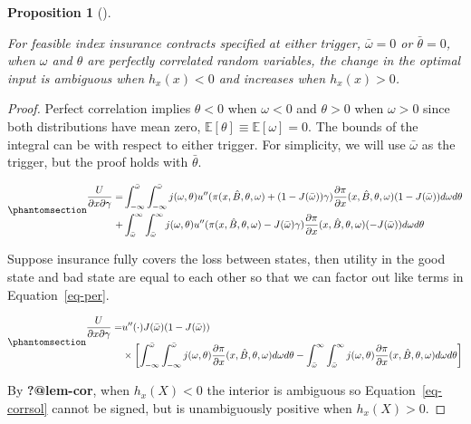 \documentclass[
  letterpaper,
  DIV=11,
  numbers=noendperiod]{scrartcl}
\theoremstyle{plain}
\theoremstyle{plain}
\newtheorem{proposition}{Proposition}[section]
\theoremstyle{remark}
\begin{document}
\begin{proposition}[]\protect\hypertarget{prp-corr}{}\label{prp-corr}

For feasible index insurance contracts specified at either trigger,
\(\bar\omega=0\) or \(\bar\theta=0\), when \(\omega\) and \(\theta\) are
perfectly correlated random variables, the change in the optimal input
is ambiguous when \(h_x(x)<0\) and increases when \(h_x(x)>0\).

\end{proposition}

\begin{proof}
Perfect correlation implies \(\theta<0\) when \(\omega<0\) and
\(\theta>0\) when \(\omega>0\) since both distributions have mean zero,
\(\mathbb{E}[\theta]\equiv\mathbb{E}[\omega]=0\). The bounds of the
integral can be with respect to either trigger. For simplicity, we will
use \(\bar\omega\) as the trigger, but the proof holds with
\(\bar\theta\).

\begin{equation}\phantomsection\label{eq-per}{
\begin{aligned}
\frac{U}{\partial x \partial \gamma}=&\int^{\bar\omega}_{-\infty} \int^{\bar\omega}_{-\infty}j(\omega,\theta)u''(\pi(x,\hat{B},\theta,\omega)+(1-J(\bar\omega))\gamma)\frac{\partial \pi}{\partial x}(x,\hat{B},\theta,\omega)(1-J(\bar\omega))d\omega d\theta\\
+&\int^{\infty}_{\bar\omega}\int^{\infty}_{\bar{\omega}}j(\omega,\theta) u''(\pi(x,\hat{B},\theta,\omega)-J(\bar\omega)\gamma)\frac{\partial \pi}{\partial x}(x,\hat{B},\theta,\omega)(-J(\bar\omega))d\omega d\theta
\end{aligned}
}\end{equation}

Suppose insurance fully covers the loss between states, then utility in
the good state and bad state are equal to each other so that we can
factor out like terms in Equation~\ref{eq-per}.

\begin{equation}\phantomsection\label{eq-corrsol}{
\begin{aligned}
\frac{U}{\partial x \partial \gamma}=&u''(\cdot)J(\bar\omega)(1-J(\bar\omega))\\
&\times\left[\int^{\bar\omega}_{-\infty} \int^{\bar\omega}_{-\infty}j(\omega,\theta)\frac{\partial \pi}{\partial x}(x,\hat{B},\theta,\omega)d\omega d\theta
-\int^{\infty}_{\bar\omega}\int^{\infty}_{\bar{\omega}}j(\omega,\theta) \frac{\partial \pi}{\partial x}(x,\hat{B},\theta,\omega)d\omega d\theta\right]
\end{aligned}
}\end{equation}

By \textbf{?@lem-cor}, when \(h_x(X)<0\) the interior is ambiguous so
Equation~\ref{eq-corrsol} cannot be signed, but is unambiguously
positive when \(h_x(X)>0\).
\end{proof}
\end{document}
